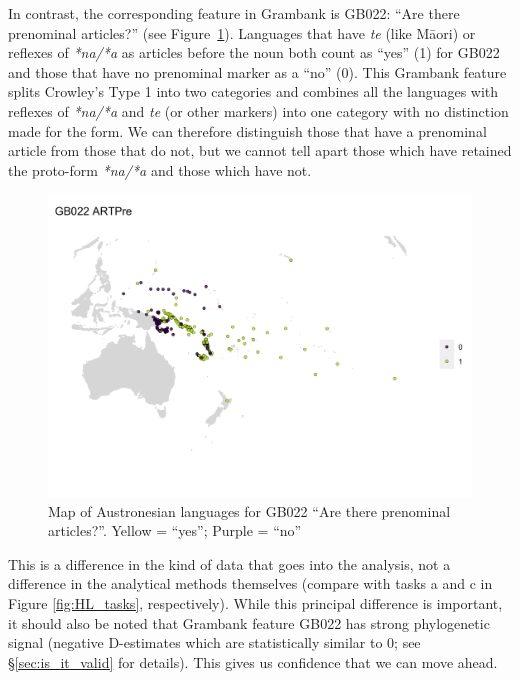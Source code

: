 \documentclass[12pt,letterpaper]{article}
\begin{document}
In contrast, the corresponding feature in Grambank is GB022: ``Are there prenominal articles?'' (see Figure~\ref{fig:gb022_map}). Languages that have \textit{te} (like M\={a}ori) or reflexes of \textit{*na/*a} as articles before the noun both count as ``yes'' (1) for GB022 and those that have no prenominal marker as a ``no'' (0). This Grambank feature splits Crowley's Type 1 into two categories and combines all the languages with reflexes of \textit{*na/*a} and \textit{te} (or other markers) into one category with no distinction made for the form. We can therefore distinguish those that have a prenominal article from those that do not, but we cannot tell apart those which have retained the proto-form \emph{*na/*a} and those which have not. 

\begin{figure}
\centering
\includegraphics[width=16cm]{illustrations/plots_from_R/coverage_plots/maps/map_GB022.png}
\caption{{Map of Austronesian languages for GB022 ``Are there prenominal articles?''. Yellow = ``yes''; Purple = ``no''}}
\label{fig:gb022_map}
\end{figure}

This is a difference in the kind of data that goes into the analysis, not a difference in the analytical methods themselves (compare with tasks a and c in Figure \ref{fig:HL_tasks}, respectively). While this principal difference is important, it should also be noted that Grambank feature GB022 has strong phylogenetic signal (negative D-estimates which are statistically similar to 0; see §\ref{sec:is_it_valid} for details). This gives us confidence that we can move ahead.
\end{document}
